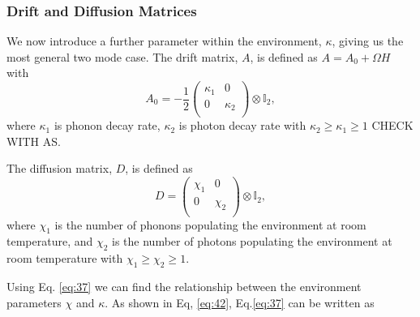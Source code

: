 \documentclass[11pt,a4paper]{article}
\numberwithin{equation}{section}
\begin{document}
	\subsubsection{Drift and Diffusion Matrices}
	\label{sec:optodefs}	
	We now introduce a further parameter within the environment, $\kappa$, giving us the most general two mode case. The drift matrix, $A$, is defined as $A = A_0 +\Omega H$ with
	\begin{equation*}
	A_0 = -\frac{1}{2} \begin{pmatrix}
	\kappa_1 & 0\\
	0 & \kappa_{2}\\
	\end{pmatrix} \otimes \mathbb{I}_2,
	\end{equation*} where $\kappa_1$ is phonon decay rate, $\kappa_{2}$ is photon decay rate with $\kappa_{2} \geq \kappa_{1} \geq 1$ \color{blue}CHECK WITH AS\color{black}.
	
	The diffusion matrix, $D$, is defined as
	\begin{equation*}
	D = \begin{pmatrix}
	\chi_1 & 0\\
	0 & \chi_2\\
	\end{pmatrix} \otimes \mathbb{I}_2,
	\end{equation*} where $\chi_{1}$ is the number of phonons populating the environment at room temperature, and $\chi_2$ is the number of photons populating the environment at room temperature with $\chi_1 \geq \chi_2 \geq 1$.
	
	Using Eq. \ref{eq:37} we can find the relationship between the environment parameters $\chi$ and $\kappa$. As shown in Eq, \ref{eq:42}, Eq.\ref{eq:37} can be written as 
	
\end{document}
